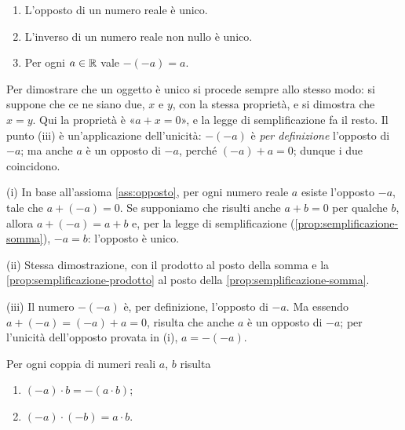 \begin{proposizione}\label{prop:unicita}
\leavevmode
\begin{enumerate}
  \item L'opposto di un numero reale è unico.
  \item L'inverso di un numero reale non nullo è unico.
  \item Per ogni $a\in\mathbb{R}$ vale $-(-a)=a$.
\end{enumerate}
\end{proposizione}

\begin{schema}
\end{schema}

\begin{strategia}
Per dimostrare che un oggetto è unico si procede sempre allo stesso modo: si suppone
che ce ne siano due, $x$ e $y$, con la stessa proprietà, e si dimostra che $x=y$. Qui
la proprietà è «$a+x=0$», e la legge di semplificazione fa il resto. Il punto (iii) è
un'applicazione dell'unicità: $-(-a)$ è \emph{per definizione} l'opposto di $-a$; ma
anche $a$ è un opposto di $-a$, perché $(-a)+a=0$; dunque i due coincidono.
\end{strategia}

\begin{dimostrazione}
(i) In base all'assioma \ref{ass:opposto}, per ogni numero reale $a$ esiste l'opposto
$-a$, tale che $a+(-a)=0$. Se supponiamo che risulti anche $a+b=0$ per qualche $b$,
allora $a+(-a)=a+b$ e, per la legge di semplificazione (\cref{prop:semplificazione-somma}),
$-a=b$: l'opposto è unico.

(ii) Stessa dimostrazione, con il prodotto al posto della somma e la
\cref{prop:semplificazione-prodotto} al posto della \cref{prop:semplificazione-somma}.

(iii) Il numero $-(-a)$ è, per definizione, l'opposto di $-a$. Ma essendo
$a+(-a)=(-a)+a=0$, risulta che anche $a$ è un opposto di $-a$; per l'unicità
dell'opposto provata in (i), $a=-(-a)$.
\end{dimostrazione}

\begin{proposizione}\label{prop:segni}
Per ogni coppia di numeri reali $a$, $b$ risulta
\begin{enumerate}
  \item $(-a)\cdot b = -(a\cdot b)$;
  \item $(-a)\cdot(-b) = a\cdot b$.
\end{enumerate}
\end{proposizione}

